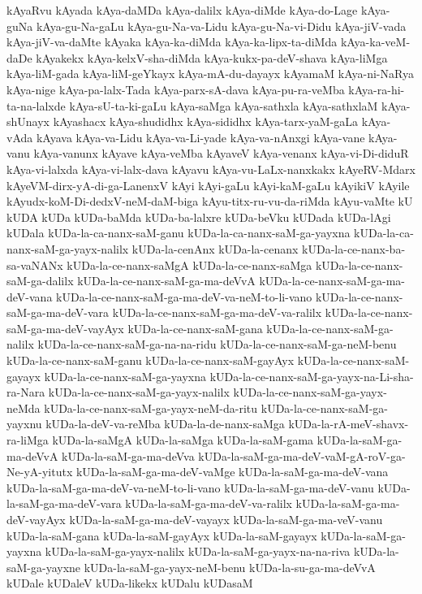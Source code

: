 {kAyaRvu
kAyada
kAya-daMDa
kAya-dalilx
kAya-diMde
kAya-do-Lage
kAya-guNa
kAya-gu-Na-gaLu
kAya-gu-Na-va-Lidu
kAya-gu-Na-vi-Didu
kAya-jiV-vada
kAya-jiV-va-daMte
kAyaka
kAya-ka-diMda
kAya-ka-lipx-ta-diMda
kAya-ka-veM-daDe
kAyakekx
kAya-kelxV-sha-diMda
kAya-kukx-pa-deV-shava
kAya-liMga
kAya-liM-gada
kAya-liM-geYkayx
kAya-mA-du-dayayx
kAyamaM
kAya-ni-NaRya
kAya-nige
kAya-pa-lalx-Tada
kAya-parx-sA-dava
kAya-pu-ra-veMba
kAya-ra-hi-ta-na-lalxde
kAya-sU-ta-ki-gaLu
kAya-saMga
kAya-sathxla
kAya-sathxlaM
kAya-shUnayx
kAyashacx
kAya-shudidhx
kAya-sididhx
kAya-tarx-yaM-gaLa
kAya-vAda
kAyava
kAya-va-Lidu
kAya-va-Li-yade
kAya-va-nAnxgi
kAya-vane
kAya-vanu
kAya-vanunx
kAyave
kAya-veMba
kAyaveV
kAya-venanx
kAya-vi-Di-diduR
kAya-vi-lalxda
kAya-vi-lalx-dava
kAyavu
kAya-vu-LaLx-nanxkakx
kAyeRV-Mdarx
kAyeVM-dirx-yA-di-ga-LanenxV
kAyi
kAyi-gaLu
kAyi-kaM-gaLu
kAyikiV
kAyile
kAyudx-koM-Di-dedxV-neM-daM-biga
kAyu-titx-ru-vu-da-riMda
kAyu-vaMte
kU
kUDA
kUDa
kUDa-baMda
kUDa-ba-lalxre
kUDa-beVku
kUDada
kUDa-lAgi
kUDala
kUDa-la-ca-nanx-saM-ganu
kUDa-la-ca-nanx-saM-ga-yayxna
kUDa-la-ca-nanx-saM-ga-yayx-nalilx
kUDa-la-cenAnx
kUDa-la-cenanx
kUDa-la-ce-nanx-ba-sa-vaNANx
kUDa-la-ce-nanx-saMgA
kUDa-la-ce-nanx-saMga
kUDa-la-ce-nanx-saM-ga-dalilx
kUDa-la-ce-nanx-saM-ga-ma-deVvA
kUDa-la-ce-nanx-saM-ga-ma-deV-vana
kUDa-la-ce-nanx-saM-ga-ma-deV-va-neM-to-li-vano
kUDa-la-ce-nanx-saM-ga-ma-deV-vara
kUDa-la-ce-nanx-saM-ga-ma-deV-va-ralilx
kUDa-la-ce-nanx-saM-ga-ma-deV-vayAyx
kUDa-la-ce-nanx-saM-gana
kUDa-la-ce-nanx-saM-ga-nalilx
kUDa-la-ce-nanx-saM-ga-na-na-ridu
kUDa-la-ce-nanx-saM-ga-neM-benu
kUDa-la-ce-nanx-saM-ganu
kUDa-la-ce-nanx-saM-gayAyx
kUDa-la-ce-nanx-saM-gayayx
kUDa-la-ce-nanx-saM-ga-yayxna
kUDa-la-ce-nanx-saM-ga-yayx-na-Li-sha-ra-Nara
kUDa-la-ce-nanx-saM-ga-yayx-nalilx
kUDa-la-ce-nanx-saM-ga-yayx-neMda
kUDa-la-ce-nanx-saM-ga-yayx-neM-da-ritu
kUDa-la-ce-nanx-saM-ga-yayxnu
kUDa-la-deV-va-reMba
kUDa-la-de-nanx-saMga
kUDa-la-rA-meV-shavx-ra-liMga
kUDa-la-saMgA
kUDa-la-saMga
kUDa-la-saM-gama
kUDa-la-saM-ga-ma-deVvA
kUDa-la-saM-ga-ma-deVva
kUDa-la-saM-ga-ma-deV-vaM-gA-roV-ga-Ne-yA-yitutx
kUDa-la-saM-ga-ma-deV-vaMge
kUDa-la-saM-ga-ma-deV-vana
kUDa-la-saM-ga-ma-deV-va-neM-to-li-vano
kUDa-la-saM-ga-ma-deV-vanu
kUDa-la-saM-ga-ma-deV-vara
kUDa-la-saM-ga-ma-deV-va-ralilx
kUDa-la-saM-ga-ma-deV-vayAyx
kUDa-la-saM-ga-ma-deV-vayayx
kUDa-la-saM-ga-ma-veV-vanu
kUDa-la-saM-gana
kUDa-la-saM-gayAyx
kUDa-la-saM-gayayx
kUDa-la-saM-ga-yayxna
kUDa-la-saM-ga-yayx-nalilx
kUDa-la-saM-ga-yayx-na-na-riva
kUDa-la-saM-ga-yayxne
kUDa-la-saM-ga-yayx-neM-benu
kUDa-la-su-ga-ma-deVvA
kUDale
kUDaleV
kUDa-likekx
kUDalu
kUDasaM
}
